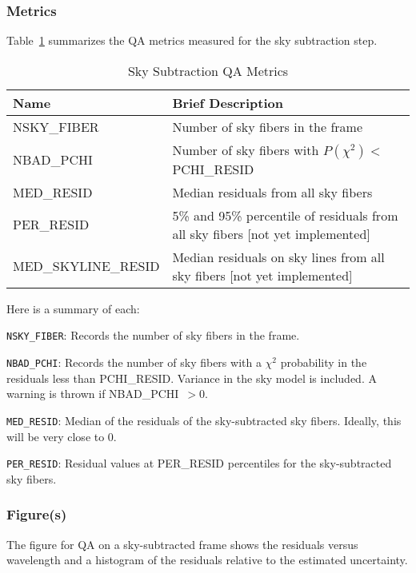 \documentclass[12pt]{article}
\begin{document}
\subsubsection{Metrics}

Table~\ref{tab:sky_metrics} summarizes the QA metrics measured
for the sky subtraction step.  

\begin{table}[h]
\begin{center}
\caption{Sky Subtraction QA Metrics}
\label{tab:sky_metrics}
\begin{tabular}{p{4.3cm}p{9.0cm}}
\hline
{\bf Name} & {\bf Brief Description}\\
\hline
NSKY\_FIBER           & Number of sky fibers in the frame \\
NBAD\_PCHI            & Number of sky fibers with $P(\chi^2) < $PCHI\_RESID \\
MED\_RESID            & Median residuals from all sky fibers \\
PER\_RESID            & 5\% and 95\% percentile of residuals from all sky fibers [not yet implemented] \\
MED\_SKYLINE\_RESID   & Median residuals on sky lines from all sky fibers [not yet implemented]\\
\hline
\end{tabular}
\end{center}
\end{table}


\noindent
Here is a summary of each:

\vskip 0.2in

\noindent
{\tt NSKY\_FIBER}:  Records the number of sky fibers in the frame.

\noindent
{\tt NBAD\_PCHI}:  Records the number of sky fibers with a 
$\chi^2$ probability in the residuals less than PCHI\_RESID.  
Variance in the sky model is included.
A warning is thrown if NBAD\_PCHI~$>0$.

\noindent
{\tt MED\_RESID}:  Median of the residuals of the sky-subtracted
sky fibers.  Ideally, this will be very close to 0.

\noindent
{\tt PER\_RESID}:  Residual values at PER\_RESID percentiles for
 the sky-subtracted sky fibers.  

\subsubsection{Figure(s)}

The figure for QA on a sky-subtracted frame shows the
residuals versus wavelength and a histogram of 
the residuals relative to the estimated uncertainty. 
\end{document}
